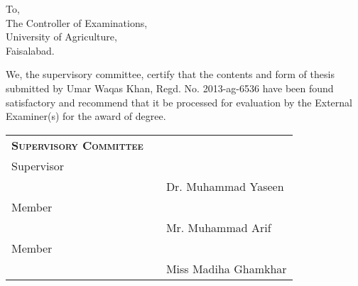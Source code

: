 \noindent
To, \vspace{0.2in}\\
The Controller of Examinations,\\
University of Agriculture,\\
Faisalabad.\\

\vspace{0.4in}

\noindent
We, the supervisory committee, certify that the contents and form of thesis submitted by Umar Waqas Khan, Regd. No. 2013-ag-6536 have been found satisfactory and recommend that it be processed for evaluation by the External Examiner(s) for the award of degree.

\vspace{0.6in}


\noindent
\begin{tabular}{lp{3.0cm}l}
\textbf{\textsc{Supervisory Committee}} &    & \vspace{0.6in}\\
Supervisor &  & \raisebox{-0.75cm}{\rule{0.25\columnwidth}{1pt}}\vspace{0.1in}\\
           &  & Dr. Muhammad Yaseen\vspace{0.7in}\\
Member     &  & \raisebox{-0.75cm}{\rule{0.25\columnwidth}{1pt}}\vspace{0.1in}\\
           &  &  Mr. Muhammad Arif \vspace{0.7in}\\
Member     &  & \raisebox{-0.75cm}{\rule{0.25\columnwidth}{1pt}}\vspace{0.1in}\\
           &  &  Miss Madiha Ghamkhar
\end{tabular}
